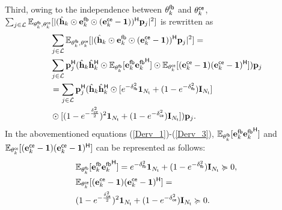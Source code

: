 \documentclass[draftclsnofoot, onecolumn, comsoc, 12pt]{IEEEtran}
\begin{document}
Third, owing to the independence between $\mathbf{\theta}_{k}^{\sf{fb}}$ and $\mathbf{\theta}_{k}^{\sf{ce}}$, $\sum_{j \in \mathcal{L}}\mathbb{E}_{\mathbf{\theta}_k^{\sf{fb}}, \mathbf{\theta}_k^{\sf{ce}}}[\vert(\hat{\mathbf{h}}_{k} \odot {\mathbf{e}_{k}^{\sf{fb}}} \odot ({\mathbf{e}_{k}^{\sf{ce}}} - \mathbf{1}))^{\sf{H}} \mathbf{p}_{j}\vert^{2}]$ is rewritten as
\begin{align}
\label{Derv_3} 
&\sum_{j \in \mathcal{L}}\mathbb{E}_{\mathbf{\theta}_k^{\sf{fb}}, \mathbf{\theta}_k^{\sf{ce}}}[\vert(\hat{\mathbf{h}}_{k} \odot {\mathbf{e}_{k}^{\sf{fb}}} \odot ({\mathbf{e}_{k}^{\sf{ce}}} - \mathbf{1}))^{\sf{H}} \mathbf{p}_{j}\vert^{2}] = 
\nonumber \\
& \sum_{j \in \mathcal{L}} \mathbf{p}_{j}^{\sf{H}}(\hat{\mathbf{h}}_{k}\hat{\mathbf{h}}_{k}^{\sf{H}} \odot\mathbb{E}_{\mathbf{\theta}_k^{\sf{fb}}}[{\mathbf{e}_{k}^{\sf{fb}}} {\mathbf{e}_{k}^{\sf{fb}}}^{\sf{H}}] \odot\mathbb{E}_{\mathbf{\theta}_k^{\sf{ce}}}[({\mathbf{e}_{k}^{\sf{ce}}}-\mathbf{1}) ({\mathbf{e}_{k}^{\sf{ce}}}-\mathbf{1})^{\sf{H}}])\mathbf{p}_{j} 
\nonumber \\
& = \sum_{j\in \mathcal{L}}\mathbf{p}_{j}^{\sf{H}}(\hat{\mathbf{h}}_{k}\hat{\mathbf{h}}_{k}^{\sf{H}} \odot[e^{-\delta_{\sf{fb}}^{2}}\mathbf{1}_{N_{{\sf{t}}}} + (1-e^{-\delta_{\sf{fb}}^{2}})\mathbf{I}_{N_{{\sf{t}}}}] 
\nonumber \\
& \odot[(1-e^{-\frac{\delta_{\sf{ce}}^{2}}{2}})^{2}\mathbf{1}_{N_{{\sf{t}}}} + (1-e^{-\delta_{\sf{ce}}^{2}})\mathbf{I}_{N_{{\sf{t}}}}])\mathbf{p}_{j}.
\end{align}
In the abovementioned equations (\ref{Derv_1})-(\ref{Derv_3}), $\mathbb{E}_{\mathbf{\theta}_{k}^{\sf{fb}}}[{\mathbf{e}_{k}^{\sf{fb}}} {\mathbf{e}_{k}^{\sf{fb}}}^{\sf{H}}]$ and $\mathbb{E}_{\mathbf{\theta}_{k}^{\sf{ce}}}[({\mathbf{e}_{k}^{\sf{ce}}}-\mathbf{1}) ({\mathbf{e}_{k}^{\sf{ce}}}-\mathbf{1})^{\sf{H}}]$ can be represented as follows:
\begin{align}
\label{Derv_4}
&\mathbb{E}_{\mathbf{\theta}_{k}^{\sf{fb}}}[{\mathbf{e}_{k}^{\sf{fb}}} {\mathbf{e}_{k}^{\sf{fb}}}^{\sf{H}}]= e^{-\delta_{\sf{fb}}^{2}} \mathbf{1}_{N_{{\sf{t}}}} + (1-e^{-\delta_{\sf{fb}}^{2}})\mathbf{I}_{N_{{\sf{t}}}} \succcurlyeq 0, \\
\label{Derv_5}
&\mathbb{E}_{\mathbf{\theta}_{k}^{\sf{ce}}}[({\mathbf{e}_{k}^{\sf{ce}}}-\mathbf{1}) ({\mathbf{e}_{k}^{\sf{ce}}}-\mathbf{1})^{\sf{H}}] = 
\nonumber \\
&(1-e^{-\frac{\delta_{\sf{ce}}^{2}}{2}})^{2}\mathbf{1}_{N_{{\sf{t}}}} + (1-e^{-\delta_{\sf{ce}}^{2}})\mathbf{I}_{N_{{\sf{t}}}} \succcurlyeq 0.
\end{align}
\end{document}
